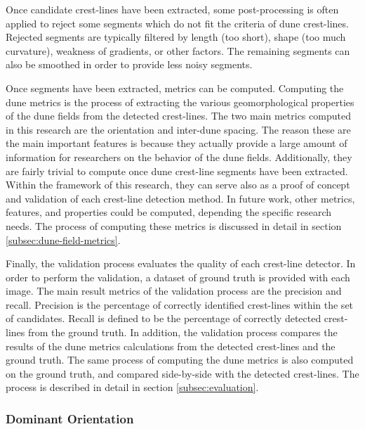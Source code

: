 Once candidate crest-lines have been extracted, some post-processing is often applied to reject some segments which do not fit the criteria of dune crest-lines. Rejected segments are typically filtered by length (too short), shape (too much curvature), weakness of gradients, or other factors. The remaining segments can also be smoothed in order to provide less noisy segments.

Once segments have been extracted, metrics can be computed. Computing the dune metrics is the process of extracting the various geomorphological properties of the dune fields from the detected crest-lines. The two main metrics computed in this research are the orientation and inter-dune spacing. The reason these are the main important features is because they actually provide a large amount of information for researchers on the behavior of the dune fields. Additionally, they are fairly trivial to compute once dune crest-line segments have been extracted. Within the framework of this research, they can serve also as a proof of concept and validation of each crest-line detection method. In future work, other metrics, features, and properties could be computed, depending the specific research needs. The process of computing these metrics is discussed in detail in section \ref{subsec:dune-field-metrics}.

Finally, the validation process evaluates the quality of each crest-line detector. In order to perform the validation, a dataset of ground truth is provided with each image. The main result metrics of the validation process are the precision and recall. Precision is the percentage of correctly identified crest-lines within the set of candidates. Recall is defined to be the percentage of correctly detected crest-lines from the ground truth. In addition, the validation process compares the results of the dune metrics calculations from the detected crest-lines and the ground truth. The same process of computing the dune metrics is also computed on the ground truth, and compared side-by-side with the detected crest-lines. The process is described in detail in section \ref{subsec:evaluation}.

\subsubsection*{Dominant Orientation} \label{subsec:dominant_orientation}
 
